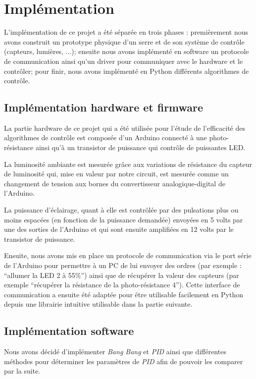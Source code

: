 \documentclass[a4paper,10pt]{report}
\begin{document}
\chapter{Implémentation}
\label{chap:impl}

L'implémentation de ce projet a été séparée en trois phases : premièrement nous avons construit un prototype physique d'un serre et de son système de contrôle (capteurs, lumières, ...); ensuite nous avons implémenté en software un protocole de communication ainsi qu'un driver pour communiquer avec le hardware et le contrôler; pour finir, nous avons implémenté en Python différents algorithmes de contrôle.

\section{Implémentation hardware et firmware}

La partie hardware de ce projet qui a été utilisée pour l'étude de l'efficacité des algorithmes de contrôle est composée d'un Arduino connecté à une photo-résistance ainsi qu'à un transistor de puissance qui contrôle de puissantes LED.

La luminosité ambiante est mesurée grâce aux variations de résistance du capteur de luminosité qui, mise en valeur par notre circuit, est mesurée comme un changement de tension aux bornes du convertisseur analogique-digital de l'Arduino.

La puissance d'éclairage, quant à elle est contrôlée par des pulsations plus ou moins espacées (en fonction de la puissance demandée) envoyées en 5 volts par une des sorties de l'Arduino et qui sont ensuite amplifiées en 12 volts par le transistor de puissance.

Ensuite, nous avons mis en place un protocole de communication via le port série de l'Arduino pour permettre à un PC de lui envoyer des ordres (par exemple : ``allumer la LED 2 à 55\%'') ainsi que de récupérer la valeur des capteurs (par exemple ``récupérer la résistance de la photo-résistance 4''). Cette interface de communication a ensuite été adaptée pour être utilisable facilement en Python depuis une librairie intuitive utilisable dans la partie suivante.


\section{Implémentation software}

Nous avons décidé d'implémenter \textit{Bang Bang} et \textit{PID} ainsi que différentes méthodes pour déterminer les paramètres de \textit{PID} afin de pouvoir les comparer par la suite.
\end{document}
